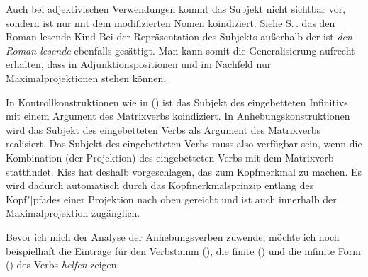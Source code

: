 Auch bei adjektivischen Verwendungen kommt das Subjekt nicht sichtbar
vor, sondern ist nur mit dem modifizierten Nomen koindiziert. Siehe S.\,\pageref{bsp-nominativ-adj}.
\ea
das den Roman lesende Kind
\z
Bei der Repräsentation des Subjekts außerhalb der \compsl ist \emph{den Roman lesende} ebenfalls gesättigt.
Man kann somit die Generalisierung aufrecht erhalten, dass in Adjunktionspositionen
und im Nachfeld nur Maximalprojektionen stehen können. 

In Kontrollkonstruktionen wie in () ist das Subjekt des eingebetteten
Infinitivs mit einem Argument des Matrixverbs koindiziert. In Anhebungskonstruktionen
wird das Subjekt des eingebetteten Verbs als Argument des Matrixverbs realisiert.
Das Subjekt des eingebetteten Verbs muss also verfügbar sein, wenn die Kombination
(der Projektion) des eingebetteten Verbs mit dem Matrixverb stattfindet. Kiss
hat deshalb vorgeschlagen, das \subjm zum Kopfmerkmal zu machen. Es wird dadurch
automatisch durch das Kopfmerkmalsprinzip entlang des Kopf"|pfades einer Projektion
nach oben gereicht und ist auch innerhalb der Maximalprojektion zugänglich.

Bevor ich mich der Analyse der Anhebungsverben zuwende, möchte ich noch beispielhaft die Einträge
für den Verbstamm (), die finite () und die infinite Form () des Verbs
\emph{helfen} zeigen:

